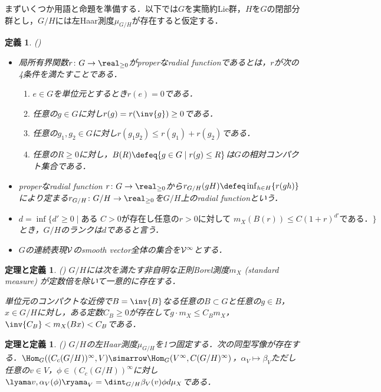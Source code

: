 \documentclass[12pt,dvipdfmx,uplatex]{jsarticle}
\newcounter{countabst}
\newtheorem{thmdef-a}[countabst]{定理と定義}
\newtheorem{def-a}[countabst]{定義}
\begin{document}
まずいくつか用語と命題を準備する．以下では$G$を実簡約Lie群，$H$を$G$の閉部分群とし，$G/H$には左Haar測度$\mu_{G/H} $が存在すると仮定する．
\begin{def-a}(\cite{ber88})
  \leavevmode\vspace{-1em}
  \begin{itemize}
  \item 局所有界関数$r\colon G\to \real_{\geq 0} $がproperなradial functionであるとは，$r$が次の4条件を満たすことである．
    \begin{enumerate}
    \item $e\in G$を単位元とするとき$r(e) = 0 $である．
    \item 任意の$g\in G$に対し$r(g) = r(\inv{g})\geq 0  $である．
    \item 任意の$g_1,g_2\in G$に対し$r(g_1g_2)\leq r(g_1) + r(g_2)  $である．
    \item 任意の$R\geq 0$に対し，$B(R)\defeq \{g\in G\mid r(g)\leq R \} $は$G$の相対コンパクト集合である．
    \end{enumerate}
  \item properなradial function $r\colon G\to \real_{\geq 0} $から$r_{G/H}(gH)\defeq \inf_{h\in H}\{r(gh) \}$により定まる${r_{G/H}\colon G/H\to \real_{\geq 0}}$を$G/H$上のradial functionという．
  \item ${d = \inf\{d'\geq 0\mid \text{ある } C > 0\text{が存在し任意の$r >0$に対して }  m_X(B(r))\leq C(1+r)^{d'}\text{である．} \} }$とき，$G/H$のランクは$d$であると言う．
  \item $G$の連続表現$\cal{V} $のsmooth vector全体の集合を$\cal{V}^{\infty} $とする．
  \end{itemize}
\end{def-a}
\begin{thmdef-a}(\cite[p.~683]{ber88})
  $G/H$には次を満たす非自明な正則Borel測度$m_X $ (standard measure) が定数倍を除いて一意的に存在する．

  単位元のコンパクトな近傍で$B = \inv{B} $なる任意の$B\subset G$と任意の$g\in B$，$x\in G/H$に対し，ある定数$C_B\geq 0 $が存在して$g\cdot m_X \leq C_B m_X$，$ \inv{C_B} < m_X(Bx) < C_{B}$である．
\end{thmdef-a}
\begin{thmdef-a}(\cite[p.~678]{ber88})
  $G/H$の左Haar測度$\mu_{G/H} $を1つ固定する．次の同型写像が存在する．$\Hom_{G}((C_c(G/H))^{\infty}, V )\simarrow \Hom_{G}(V^{\infty}, C(G/H)^{\infty}) $，$\alpha_V\mapsto \beta_V$ただし任意の$v\in V$，$\phi \in  (C_c(G/H))^{\infty} $に対し$ \lyama v,\alpha_V(\phi)\ryama_{V} = \dint_{G/H}\beta_V(v)\phi d\mu_X  $である．
\end{thmdef-a}
\end{document}
